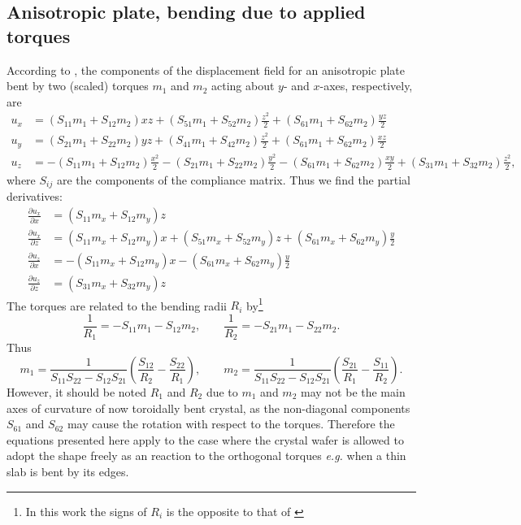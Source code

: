 \documentclass[11pt,a4paper]{article}
\begin{document}
\subsection{Anisotropic plate, bending due to applied torques}
According to \cite{Chukhovskii_1994}, the components of the displacement field for an anisotropic plate bent by two (scaled) torques $m_1$ and $m_2$ acting about $y$- and $x$-axes, respectively, are
\begin{align}
u_x &= (S_{11} m_1 + S_{12} m_2) x z + (S_{51} m_1 + S_{52} m_2)\frac{z^2}{2} + (S_{61} m_1 +S_{62} m_2) \frac{y z}{2} \\
u_y &= (S_{21} m_1 + S_{22} m_2) y z + (S_{41} m_1 + S_{42} m_2)\frac{z^2}{2} + (S_{61} m_1 +S_{62} m_2) \frac{x z}{2} \\
u_z &= -(S_{11} m_1 + S_{12} m_2)\frac{x^2}{2} -(S_{21} m_1 + S_{22} m_2)\frac{y^2}{2} -(S_{61} m_1 +S_{62} m_2) \frac{x y}{2} +(S_{31} m_1 + S_{32} m_2)\frac{z^2}{2},
\end{align} 
where $S_{ij}$ are the components of the compliance matrix. Thus we find the partial derivatives:
\begin{align}
\frac{\partial u_x}{\partial x} &= (S_{11} m_x + S_{12} m_y) z \\
\frac{\partial u_x}{\partial z} &= (S_{11} m_x + S_{12} m_y) x + (S_{51} m_x + S_{52} m_y) z 
+ (S_{61} m_x + S_{62} m_y) \frac{y}{2}\\
\frac{\partial u_z}{\partial x} &= -(S_{11} m_x + S_{12} m_y) x -(S_{61} m_x + S_{62} m_y) \frac{y}{2} \\
\frac{\partial u_z}{\partial z} &= (S_{31} m_x + S_{32} m_y) z
\end{align} 
The torques are related to the bending radii $R_i$ by\footnote{In this work the signs of $R_i$ is the opposite to that of \cite{Chukhovskii_1994}}
\begin{equation}
\frac{1}{R_1} = -S_{11} m_1 - S_{12} m_2, \qquad
\frac{1}{R_2} = -S_{21} m_1 - S_{22} m_2.
\end{equation}
Thus
\begin{equation}
m_1 = \frac{1}{S_{11}S_{22}-S_{12}S_{21}}\left(\frac{S_{12}}{R_2}-\frac{S_{22}}{R_1} \right), \qquad
m_2 = \frac{1}{S_{11}S_{22}-S_{12}S_{21}}\left(\frac{S_{21}}{R_1}-\frac{S_{11}}{R_2} \right).
\label{eq:ms}
\end{equation}
However, it should be noted $R_1$ and $R_2$ due to $m_1$ and $m_2$ may not be the main axes of curvature of now toroidally bent crystal, as the non-diagonal components $S_{61}$ and $S_{62}$ may cause the rotation with respect to the torques. Therefore the equations presented here apply to the case where the crystal wafer is allowed to adopt the shape freely as an reaction to the orthogonal torques \emph{e.g.} when a thin slab is bent by its edges.
\end{document}
